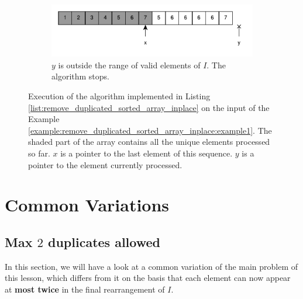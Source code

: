 \begin{figure}
\begin{subfigure}[t]{0.49\textwidth}
		\label{fig:remove_duplicated_sorted_array_inplace:example1_6}
	 \end{subfigure}
	 \hfill
	 \begin{subfigure}[t]{0.49\textwidth}
		\includegraphics[width=1\linewidth]{sources/remove_duplicated_sorted_array_inplace/images/example1_15}
		\vspace*{-8mm}
		\caption{$y$ is outside the range of valid elements of $I$. The algorithm stops.}
		\label{fig:remove_duplicated_sorted_array_inplace:example1_6}
	 \end{subfigure}
\caption{Execution of the algorithm implemented in Listing
 \ref{list:remove_duplicated_sorted_array_inplace} on the input of the Example
 \ref{example:remove_duplicated_sorted_array_inplace:example1}. The shaded part of the array
 contains all the unique elements processed so far. $x$ is a pointer to the last element of this
 sequence. $y$ is a pointer to the element currently processed.}
\label{fig:remove_duplicated_sorted_array_inplace:example1_process}
\end{figure}

\section{Common Variations}
\subsection{Max $2$ duplicates allowed}
In this section, we will have a look at a common variation of the main problem of this lesson, which differs from it on the basis that each element can now appear at \textbf{most twice} in the final rearrangement of $I$.

